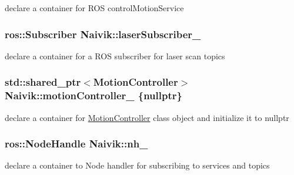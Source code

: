 declare a container for R\+OS control\+Motion\+Service 

\subsubsection[{\texorpdfstring{laser\+Subscriber\+\_\+}{laserSubscriber_}}]{\setlength{\rightskip}{0pt plus 5cm}ros\+::\+Subscriber Naivik\+::laser\+Subscriber\+\_\+\hspace{0.3cm}{\ttfamily [private]}}\hypertarget{classNaivik_a0f001e2ba2dcd1ca7c2fa92eff2c1562}{}\label{classNaivik_a0f001e2ba2dcd1ca7c2fa92eff2c1562}


declare a container for a R\+OS subscriber for laser scan topics 

\subsubsection[{\texorpdfstring{motion\+Controller\+\_\+}{motionController_}}]{\setlength{\rightskip}{0pt plus 5cm}std\+::shared\+\_\+ptr$<${\bf Motion\+Controller}$>$ Naivik\+::motion\+Controller\+\_\+ \{nullptr\}\hspace{0.3cm}{\ttfamily [private]}}\hypertarget{classNaivik_a96923f306061a14093c74c5700c1bb8a}{}\label{classNaivik_a96923f306061a14093c74c5700c1bb8a}


declare a container for \hyperlink{classMotionController}{Motion\+Controller} class object and initialize it to nullptr 

\subsubsection[{\texorpdfstring{nh\+\_\+}{nh_}}]{\setlength{\rightskip}{0pt plus 5cm}ros\+::\+Node\+Handle Naivik\+::nh\+\_\+\hspace{0.3cm}{\ttfamily [private]}}\hypertarget{classNaivik_af964150f253e4cbaa15bcd1537511af9}{}\label{classNaivik_af964150f253e4cbaa15bcd1537511af9}


declare a container to Node handler for subscribing to services and topics 

